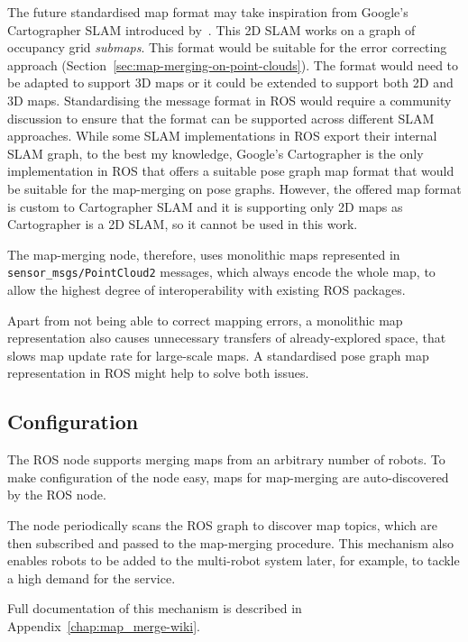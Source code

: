 The future standardised map format may take inspiration from Google's Cartographer \gls{SLAM} introduced by~\citet{hess2016cartographer}. This \gls{2D} \gls{SLAM} works on a graph of occupancy grid \textit{submaps}. This format would be suitable for the error correcting approach (Section~\ref{sec:map-merging-on-point-clouds}). The format would need to be adapted to support \gls{3D} maps or it could be extended to support both \gls{2D} and \gls{3D} maps. Standardising the message format in \gls{ROS} would require a community discussion to ensure that the format can be supported across different \gls{SLAM} approaches. While some \gls{SLAM} implementations in \gls{ROS} export their internal \gls{SLAM} graph, to the best my knowledge, Google's Cartographer is the only implementation in \gls{ROS} that offers a suitable pose graph map format that would be suitable for the map-merging on pose graphs. However, the offered map format is custom to Cartographer \gls{SLAM} and it is supporting only \gls{2D} maps as Cartographer is a \gls{2D} \gls{SLAM}, so it cannot be used in this work.

The map-merging node, therefore, uses monolithic maps represented in \texttt{sen\-sor\_msgs/\-Point\-Cloud2} messages, which always encode the whole map, to allow the highest degree of interoperability with existing \gls{ROS} packages.

Apart from not being able to correct mapping errors, a monolithic map representation also causes unnecessary transfers of already-explored space, that slows map update rate for large-scale maps. A standardised pose graph map representation in \gls{ROS} might help to solve both issues.

\subsection{Configuration}
\label{sec:configuration}

The \gls{ROS} node supports merging maps from an arbitrary number of robots. To make configuration of the node easy, maps for map-merging are auto-discovered by the \gls{ROS} node.

The node periodically scans the \gls{ROS} graph to discover map topics, which are then subscribed and passed to the map-merging procedure. This mechanism also enables robots to be added to the multi-robot system later, for example, to tackle a high demand for the service.

Full documentation of this mechanism is described in Appendix~\ref{chap:map_merge-wiki}.

